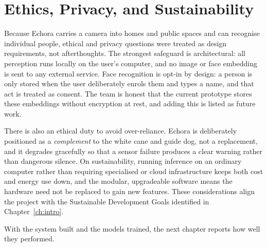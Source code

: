 \section{Ethics, Privacy, and Sustainability}

Because Echora carries a camera into homes and public spaces and can recognise individual people, ethical and privacy questions were treated as design requirements, not afterthoughts. The strongest safeguard is architectural: all perception runs locally on the user's computer, and no image or face embedding is sent to any external service. Face recognition is opt-in by design: a person is only stored when the user deliberately enrols them and types a name, and that act is treated as consent. The team is honest that the current prototype stores these embeddings without encryption at rest, and adding this is listed as future work.

There is also an ethical duty to avoid over-reliance. Echora is deliberately positioned as a \emph{complement} to the white cane and guide dog, not a replacement, and it degrades gracefully so that a sensor failure produces a clear warning rather than dangerous silence. On sustainability, running inference on an ordinary computer rather than requiring specialised or cloud infrastructure keeps both cost and energy use down, and the modular, upgradeable software means the hardware need not be replaced to gain new features. These considerations align the project with the Sustainable Development Goals identified in Chapter~\ref{ch:intro}.

With the system built and the models trained, the next chapter reports how well they performed.
